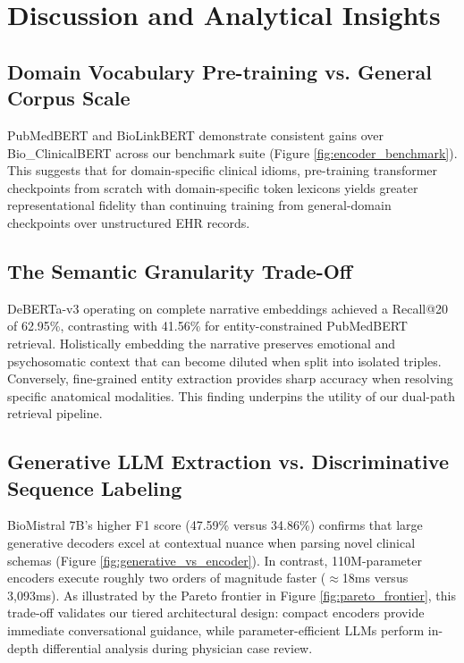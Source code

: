 
\section{Discussion and Analytical Insights}

\subsection{Domain Vocabulary Pre-training vs. General Corpus Scale}
PubMedBERT and BioLinkBERT demonstrate consistent gains over Bio\_ClinicalBERT across our benchmark suite (Figure \ref{fig:encoder_benchmark}). This suggests that for domain-specific clinical idioms, pre-training transformer checkpoints from scratch with domain-specific token lexicons yields greater representational fidelity than continuing training from general-domain checkpoints over unstructured EHR records.

\subsection{The Semantic Granularity Trade-Off}
DeBERTa-v3 operating on complete narrative embeddings achieved a Recall@20 of 62.95\%, contrasting with 41.56\% for entity-constrained PubMedBERT retrieval. Holistically embedding the narrative preserves emotional and psychosomatic context that can become diluted when split into isolated triples. Conversely, fine-grained entity extraction provides sharp accuracy when resolving specific anatomical modalities. This finding underpins the utility of our dual-path retrieval pipeline.

\subsection{Generative LLM Extraction vs. Discriminative Sequence Labeling}
BioMistral 7B's higher F1 score (47.59\% versus 34.86\%) confirms that large generative decoders excel at contextual nuance when parsing novel clinical schemas (Figure \ref{fig:generative_vs_encoder}). In contrast, 110M-parameter encoders execute roughly two orders of magnitude faster ($\approx$18ms versus 3,093ms). As illustrated by the Pareto frontier in Figure \ref{fig:pareto_frontier}, this trade-off validates our tiered architectural design: compact encoders provide immediate conversational guidance, while parameter-efficient LLMs perform in-depth differential analysis during physician case review.
